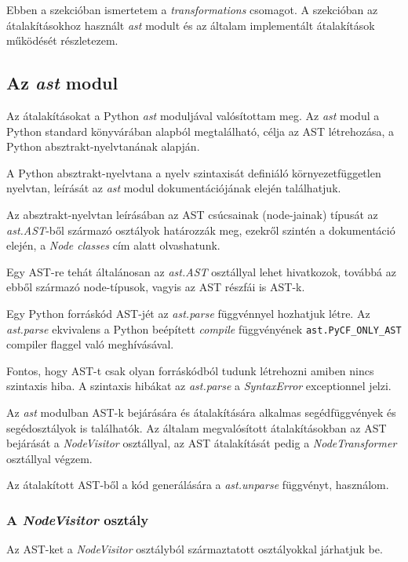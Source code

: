 Ebben a szekcióban ismertetem a \emph{transformations} csomagot.
A szekcióban az átalakításokhoz használt \emph{ast} modult és
az általam implementált átalakítások működését részletezem.

\subsection{Az \emph{ast} modul}

Az átalakításokat a Python \emph{ast} moduljával valósítottam meg.
Az \emph{ast} modul a Python standard könyvárában alapból megtalálható, 
célja az AST létrehozása, a Python absztrakt-nyelvtanának alapján.

A Python absztrakt-nyelvtana a nyelv szintaxisát definiáló környezetfüggetlen nyelvtan,
leírását az \emph{ast} modul dokumentációjának \cite{pythonAST} elején találhatjuk.

Az absztrakt-nyelvtan leírásában az AST csúcsainak (node-jainak) típusát az
\emph{ast.AST}-ből származó osztályok határozzák meg,
ezekről szintén a dokumentáció elején, a \emph{Node classes} cím alatt olvashatunk.

Egy AST-re tehát általánosan az \emph{ast.AST} osztállyal lehet hivatkozok,
továbbá az ebből származó node-típusok, vagyis az AST részfái is AST-k.


Egy Python forráskód AST-jét az \emph{ast.parse} függvénnyel hozhatjuk létre.
Az \emph{ast.parse} ekvivalens a Python beépített
\emph{compile} függvényének \texttt{ast.PyCF\_ONLY\_AST} compiler flaggel való
meghívásával.

Fontos, hogy AST-t csak olyan forráskódból tudunk létrehozni amiben nincs
szintaxis hiba.
A szintaxis hibákat az \emph{ast.parse} a \emph{SyntaxError} exceptionnel jelzi.

Az \emph{ast} modulban AST-k bejárására és átalakítására alkalmas
segédfüggvények és segédosztályok is találhatók.
Az általam megvalósított átalakításokban
az AST bejárását a \emph{NodeVisitor} osztállyal,
az AST átalakítását pedig a \emph{NodeTransformer} osztállyal
végzem.

Az átalakított AST-ből a kód generálására a \emph{ast.unparse} függvényt, használom.

\subsubsection{A \emph{NodeVisitor} osztály}

Az AST-ket a \emph{NodeVisitor} osztályból származtatott osztályokkal járhatjuk be.

